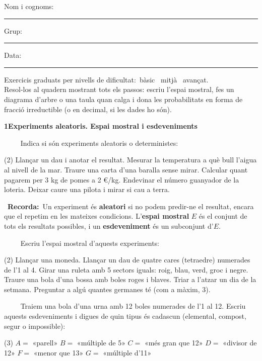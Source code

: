 \documentclass[11pt,a4paper]{article}
\newcommand{\estrelles}[1]{{\color{accent}\ifcase#1\or\faStar\faStar[regular]\faStar[regular]\or\faStar\faStar\faStar[regular]\or\faStar\faStar\faStar\fi}}
\newcounter{exer}
\newcommand{\ex}[1]{\par\needspace{4\baselineskip}\medskip\stepcounter{exer}\noindent{\color{navy}\bfseries\theexer.}\ \ {\small\estrelles{#1}}\ \ }
\newcommand{\seccio}[2]{\par\needspace{10\baselineskip}\bigskip
  \begin{tcolorbox}[colback=navy,colframe=navy,coltext=white,arc=2mm,boxrule=0pt,left=3mm,right=3mm,top=1.2mm,bottom=1.2mm]
  {\large\bfseries #1\quad #2}
  \end{tcolorbox}\vspace{-2pt}}
\newcommand{\recorda}[1]{\par\smallskip\begin{tcolorbox}[colback=accent!7,colframe=accent!55,arc=2mm,boxrule=0.5pt,left=2.5mm,right=2.5mm,top=1mm,bottom=1mm]\small{\color{accent}\faLightbulb[regular]}\ \textbf{Recorda:}\ #1\end{tcolorbox}}
\begin{document}
\thispagestyle{primera}

\vspace{10pt}
Nom i cognoms: \rule{8.4cm}{0.4pt}\hfill Grup: \rule{1.6cm}{0.4pt}\hfill Data: \rule{2.2cm}{0.4pt}
\vspace{8pt}

\begin{tcolorbox}[colback=soft,colframe=soft,arc=2mm,left=3mm,right=3mm,top=1.5mm,bottom=1.5mm]
\small Exercicis graduats per nivells de dificultat:\quad \estrelles{1}\ bàsic \qquad \estrelles{2}\ mitjà \qquad \estrelles{3}\ avançat.\\[2pt] Resol-los al quadern mostrant tots els passos: escriu l'espai mostral, fes un diagrama d'arbre o una taula quan calga i dona les probabilitats en forma de fracció irreductible (o en decimal, si les dades ho són).
\end{tcolorbox}

\seccio{1}{Experiments aleatoris. Espai mostral i esdeveniments}

\ex{1} Indica si són experiments aleatoris o deterministes:\begin{tasks}(2)
  \task Llançar un dau i anotar el resultat.
  \task Mesurar la temperatura a què bull l'aigua al nivell de la mar.
  \task Traure una carta d'una baralla sense mirar.
  \task Calcular quant pagarem per 3 kg de pomes a 2 €/kg.
  \task Endevinar el número guanyador de la loteria.
  \task Deixar caure una pilota i mirar si cau a terra.
\end{tasks}\recorda{Un experiment és \textbf{aleatori} si no podem predir-ne el resultat, encara que el repetim en les mateixes condicions. L'\textbf{espai mostral} $E$ és el conjunt de tots els resultats possibles, i un \textbf{esdeveniment} és un subconjunt d'$E$.}

\ex{1} Escriu l'espai mostral d'aquests experiments:\begin{tasks}(2)
  \task Llançar una moneda.
  \task Llançar un dau de quatre cares (tetraedre) numerades de l'1 al 4.
  \task Girar una ruleta amb 5 sectors iguals: roig, blau, verd, groc i negre.
  \task Traure una bola d'una bossa amb boles roges i blaves.
  \task Triar a l'atzar un dia de la setmana.
  \task Preguntar a algú quantes germanes té (com a màxim, 3).
\end{tasks}

\ex{1} Traiem una bola d'una urna amb 12 boles numerades de l'1 al 12. Escriu aquests esdeveniments i digues de quin tipus és cadascun (elemental, compost, segur o impossible):\begin{tasks}(3)
  \task $A=$ «parell»
  \task $B=$ «múltiple de 5»
  \task $C=$ «més gran que 12»
  \task $D=$ «divisor de 12»
  \task $F=$ «menor que 13»
  \task $G=$ «múltiple d'11»
\end{tasks}
\end{document}
